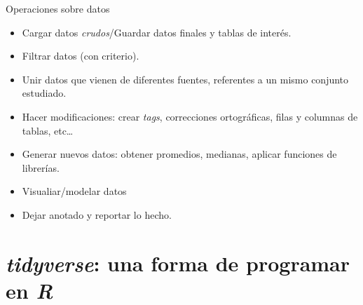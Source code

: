 \documentclass[
  10pt,
  ignorenonframetext,
]{beamer}
\providecommand{\tightlist}{%
  \setlength{\itemsep}{0pt}\setlength{\parskip}{0pt}}
\begin{document}
\begin{frame}{Operaciones sobre datos}
\protect\hypertarget{operaciones-sobre-datos}{}
\begin{itemize}
\tightlist
\item
  Cargar datos \emph{crudos}/Guardar datos finales y tablas de interés.
  \vspace{10pt}
\item
  Filtrar datos (con criterio). \vspace{10pt}
\item
  Unir datos que vienen de diferentes fuentes, referentes a un mismo
  conjunto estudiado. \vspace{10pt}
\item
  Hacer modificaciones: crear \emph{tags}, correcciones ortográficas,
  filas y columnas de tablas, etc\ldots{} \vspace{10pt}
\item
  Generar nuevos datos: obtener promedios, medianas, aplicar funciones
  de librerías. \vspace{10pt}
\item
  Visualiar/modelar datos \vspace{10pt}
\item
  Dejar anotado y reportar lo hecho.
\end{itemize}
\end{frame}

\hypertarget{tidyverse-una-forma-de-programar-en-r}{%
\section{\texorpdfstring{\emph{tidyverse}: una forma de programar en
\emph{R}}{tidyverse: una forma de programar en R}}\label{tidyverse-una-forma-de-programar-en-r}}
\end{document}
